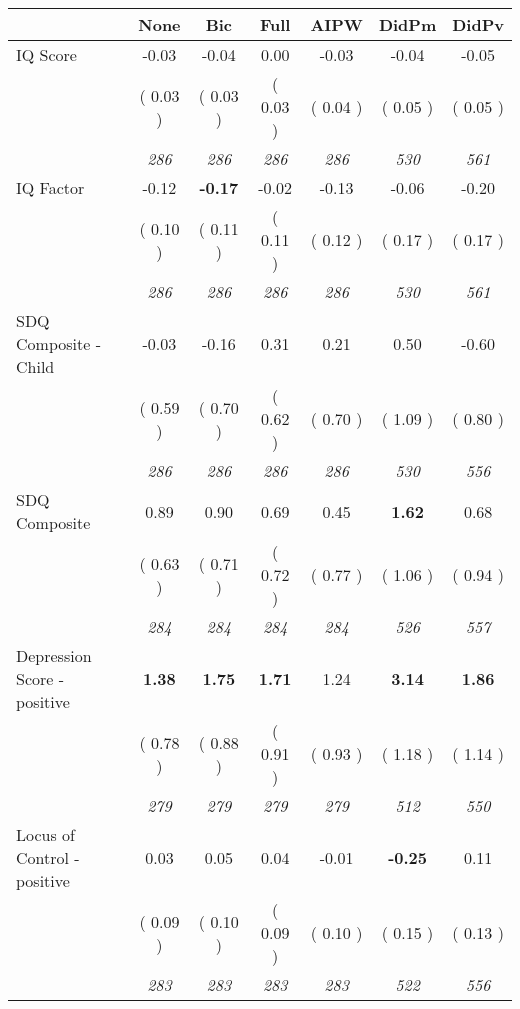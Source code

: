 \begin{tabular}{l c c c c c c}
\toprule
 & None & Bic & Full & AIPW & DidPm & DidPv \\
\midrule
IQ Score &     -0.03 &     -0.04 &      0.00 &     -0.03 &     -0.04 &     -0.05 \\
& (     0.03 ) & (     0.03 ) & (     0.03 ) & (     0.04 ) & (     0.05 ) & (     0.05 ) \\
& \textit{ 286 } & \textit{ 286 } & \textit{ 286 } & \textit{ 286 } & \textit{ 530 } & \textit{ 561 } \\
IQ Factor &     -0.12 & \textbf{     -0.17 } &     -0.02 &     -0.13 &     -0.06 &     -0.20 \\
& (     0.10 ) & (     0.11 ) & (     0.11 ) & (     0.12 ) & (     0.17 ) & (     0.17 ) \\
& \textit{ 286 } & \textit{ 286 } & \textit{ 286 } & \textit{ 286 } & \textit{ 530 } & \textit{ 561 } \\
SDQ Composite - Child &     -0.03 &     -0.16 &      0.31 &      0.21 &      0.50 &     -0.60 \\
& (     0.59 ) & (     0.70 ) & (     0.62 ) & (     0.70 ) & (     1.09 ) & (     0.80 ) \\
& \textit{ 286 } & \textit{ 286 } & \textit{ 286 } & \textit{ 286 } & \textit{ 530 } & \textit{ 556 } \\
SDQ Composite &      0.89 &      0.90 &      0.69 &      0.45 & \textbf{      1.62 } &      0.68 \\
& (     0.63 ) & (     0.71 ) & (     0.72 ) & (     0.77 ) & (     1.06 ) & (     0.94 ) \\
& \textit{ 284 } & \textit{ 284 } & \textit{ 284 } & \textit{ 284 } & \textit{ 526 } & \textit{ 557 } \\
Depression Score - positive & \textbf{      1.38 } & \textbf{      1.75 } & \textbf{      1.71 } &      1.24 & \textbf{      3.14 } & \textbf{      1.86 } \\
& (     0.78 ) & (     0.88 ) & (     0.91 ) & (     0.93 ) & (     1.18 ) & (     1.14 ) \\
& \textit{ 279 } & \textit{ 279 } & \textit{ 279 } & \textit{ 279 } & \textit{ 512 } & \textit{ 550 } \\
Locus of Control - positive &      0.03 &      0.05 &      0.04 &     -0.01 & \textbf{     -0.25 } &      0.11 \\
& (     0.09 ) & (     0.10 ) & (     0.09 ) & (     0.10 ) & (     0.15 ) & (     0.13 ) \\
& \textit{ 283 } & \textit{ 283 } & \textit{ 283 } & \textit{ 283 } & \textit{ 522 } & \textit{ 556 } \\

\end{tabular}
